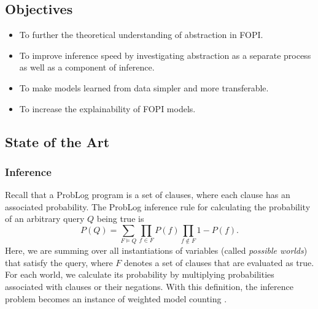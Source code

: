 \documentclass[11pt,english,twocolumn]{article}
\begin{document}


\subsection*{Objectives}

\begin{itemize}
\item To further the theoretical understanding of abstraction in FOPI.
\item To improve inference speed by investigating abstraction as a separate
  process as well as a component of inference.
\item To make models learned from data simpler and more transferable.
\item To increase the explainability of FOPI models.
\end{itemize}

\subsection*{State of the Art} %

\subsubsection*{Inference}

Recall that a ProbLog program is a set of clauses, where each clause has an
associated probability. The ProbLog inference rule
\cite{DBLP:series/synthesis/2016Raedt,DBLP:conf/iclp/Sato95} for calculating the
probability of an arbitrary query $Q$ being true is
\[
  P(Q) = \sum_{F \models Q} \prod_{f \in F} P(f) \prod_{f \not\in F} 1 -
  P(f).
\]
Here, we are summing over all instantiations of variables (called \emph{possible
worlds}) that satisfy the query, where $F$ denotes a set of clauses that are
evaluated as true. For each world, we calculate its probability by multiplying
probabilities associated with clauses or their negations. With this
definition, the inference problem becomes an instance of weighted model
counting \cite{DBLP:series/synthesis/2016Raedt}.
\end{document}
